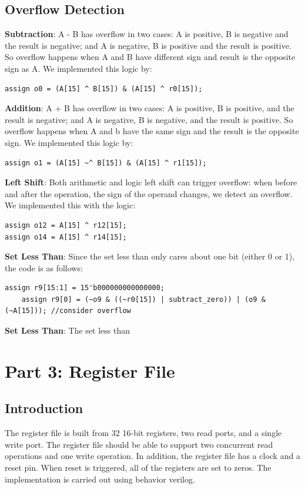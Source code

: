 \documentclass{article}
\begin{document}
\subsection{Overflow Detection}
\textbf{Subtraction}: A - B has overflow in two cases: A is positive, B is negative and the result is negative; and A is negative, B is positive and the result is positive. So overflow happens when A and B have different sign and result is the opposite sign as A. We implemented this logic by: 
\begin{verbatim}
assign o0 = (A[15] ^ B[15]) & (A[15] ^ r0[15]);
\end{verbatim}
\vspace{5mm}
\textbf{Addition}: A + B has overflow in two cases: A is positive, B is positive, and the result is negative; and A is negative, B is negative, and the result is positive. So overflow happens when A and b have the same sign and the result is the opposite sign. We implemented this logic by:
\begin{verbatim}
assign o1 = (A[15] ~^ B[15]) & (A[15] ^ r1[15]);
\end{verbatim}
\vspace{5mm}
\textbf{Left Shift}: 
Both arithmetic and logic left shift can trigger overflow: when before and after the operation, the sign of the operand changes, we detect an overflow. We implemented this with the logic: 
\begin{verbatim}
assign o12 = A[15] ^ r12[15];
assign o14 = A[15] ^ r14[15];
\end{verbatim}
\vspace{5mm}
\textbf{Set Less Than}: 
Since the set less than only cares about one bit (either 0 or 1), the code is as follows: 
\begin{verbatim}
assign r9[15:1] = 15'b000000000000000;
	assign r9[0] = (~o9 & ((~r0[15]) | subtract_zero)) | (o9 & (~A[15])); //consider overflow
\end{verbatim}
\textbf{Set Less Than}: The set less than 



\section{Part 3: Register File }
\subsection{Introduction}
The register file is built from 32 16-bit registers, two read ports, and a single write port. The register file should be able to support two concurrent read operations and one write operation. In addition, the register file has a clock and a reset pin. When reset is triggered, all of the registers are set to zeros. The implementation is carried out using behavior verilog. 
\end{document}
